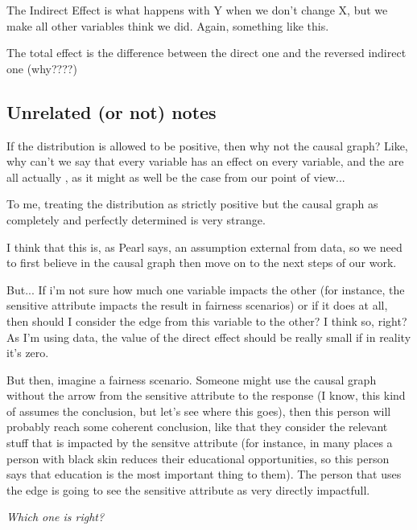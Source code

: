 The Indirect Effect is what happens with Y when we don't change X, but we make all other variables think we did. Again, something like this.

The total effect is the difference between the direct one and the reversed indirect one (why????)





\subsection{Unrelated (or not) notes}

If the distribution is allowed to be positive, then why not the causal graph? Like, why can't we say that every variable has an effect on every variable, and the  are all actually , as it might as well be the case from our point of view...

To me, treating the distribution as strictly positive but the causal graph as completely and perfectly determined is very strange.

I think that this is, as Pearl says, an assumption external from data, so we need to first believe in the causal graph then move on to the next steps of our work.

But... If i'm not sure how much one variable impacts the other (for instance, the sensitive attribute impacts the result in fairness scenarios) or if it does at all, then should I consider the edge from this variable to the other? I think so, right? As I'm using data, the value of the direct effect should be really small if in reality it's zero.

But then, imagine a fairness scenario. Someone might use the causal graph without the arrow from the sensitive attribute to the response (I know, this kind of assumes the conclusion, but let's see where this goes), then this person will probably reach some coherent conclusion, like that they consider the relevant stuff that is impacted by the sensitve attribute (for instance, in many places a person with black skin reduces their educational opportunities, so this person says that education is the most important thing to them). The person that uses the edge is going to see the sensitive attribute as very directly impactfull.

\textit{Which one is right?}

